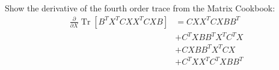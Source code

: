 \begin{exercise}
   Show the derivative of the fourth order trace from the Matrix Cookbook:
   \begin{align*}
      \tag{123}
\frac{\partial}{\partial X} \operatorname{Tr}\left[B^T X^T C X X^T C X B\right]
&= C X X^T C X B B^T 
\\&+ C^T X B B^T X^T C^T X 
\\&+ C X B B^T X^T C X 
\\&+ C^T X X^T C^T X B B^T
   \end{align*}
\end{exercise}

